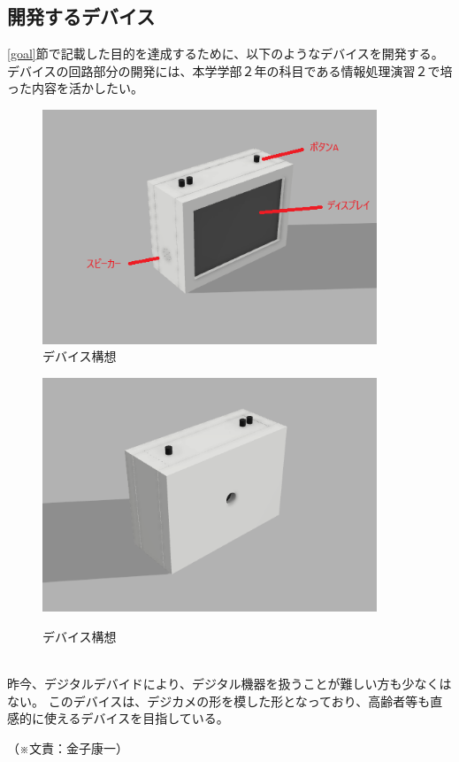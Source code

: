 \documentclass[12pt,a4paper]{report}
\newcommand{\Writer}[1]{
  \normalsize
  \begin{flushright}
    （※文責：#1）
  \end{flushright}
}
\begin{document}
\subsection{開発するデバイス}
\noindent\space
\ref{goal}節で記載した目的を達成するために、以下のようなデバイスを開発する。
デバイスの回路部分の開発には、本学学部２年の科目である情報処理演習２で培った内容を活かしたい。
\begin{figure}[htbp]
  \begin{center}
    \includegraphics[width=100mm]{images/cad1.png}\\
    \caption{デバイス構想}
  \end{center}
  \begin{center}
    \includegraphics[width=100mm]{images/cad2.png}\\
    \caption{デバイス構想}
  \end{center}
\end{figure}\\
昨今、デジタルデバイドにより、デジタル機器を扱うことが難しい方も少なくはない。
このデバイスは、デジカメの形を模した形となっており、高齢者等も直感的に使えるデバイスを目指している。
\Writer{金子康一}

\newpage
\end{document}
